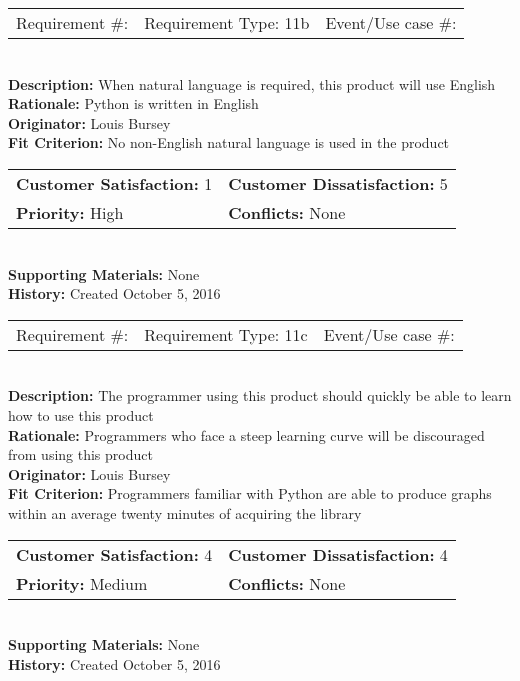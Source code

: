 \documentclass[12pt, titlepage]{article}
\begin{document}
%
%
\begin{reqbox}
\begin{tabular}{ccc}
Requirement \#: & Requirement Type: 11b & Event/Use case \#: \\
\end{tabular} \\
\textbf{Description:} When natural language is required, this product will use English \\
\textbf{Rationale:} Python is written in English \\
\textbf{Originator:} Louis Bursey\\
\textbf{Fit Criterion:}  No non-English natural language is used in the product \\
\begin{tabular}{ll}
\textbf{Customer Satisfaction:} 1 & \textbf{Customer Dissatisfaction:} 5 \\
\textbf{Priority:} High & \textbf{Conflicts:} None\\
\end{tabular} \\
\textbf{Supporting Materials:} None \\
\textbf{History:} Created October 5, 2016
\end{reqbox}
%
%
%
%
\begin{reqbox}
\begin{tabular}{ccc}
Requirement \#: & Requirement Type: 11c & Event/Use case \#: \\
\end{tabular} \\
\textbf{Description:} The programmer using this product should quickly be able to learn how to use this product \\
\textbf{Rationale:} Programmers who face a steep learning curve will be discouraged from using this product \\
\textbf{Originator:} Louis Bursey\\
\textbf{Fit Criterion:}  Programmers familiar with Python are able to produce graphs within an average twenty minutes of acquiring the library \\
\begin{tabular}{ll}
\textbf{Customer Satisfaction:} 4 & \textbf{Customer Dissatisfaction:} 4 \\
\textbf{Priority:} Medium & \textbf{Conflicts:} None\\
\end{tabular} \\
\textbf{Supporting Materials:} None \\
\textbf{History:} Created October 5, 2016
\end{reqbox}
\end{document}
